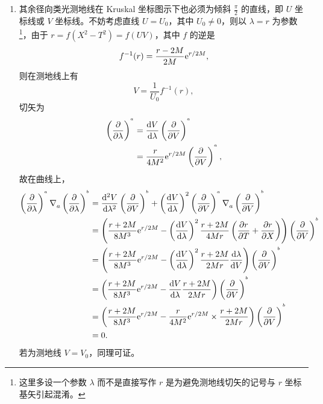 \begin{xiti}
\begin{zm}
\begin{enumerate}[label = (\arabic*)]
			\item 其余径向类光测地线在 Kruskal 坐标图示下也必须为倾斜 $\frac{\pi}{2}$ 的直线，即 $U$ 坐标线或 $V$ 坐标线。不妨考虑直线 $U = U_0$，其中 $U_0 \neq 0$，则以 $\lambda=r$ 为参数\footnote{这里多设一个参数 $\lambda$ 而不是直接写作 $r$ 是为避免测地线切矢的记号与 $r$ 坐标基矢引起混淆。}，由于 $r = f(X^2 - T^2) = f(UV)$，其中 $f$ 的逆是
			\begin{equation*}
				f^{-1}(r) = \frac{r-2M}{2M} \mathrm{e}^{r/2M},
			\end{equation*}
			则在测地线上有
			\begin{equation*}
				V = \frac{1}{U_0} f^{-1}(r),
			\end{equation*}
			切矢为
				\begin{align*}
					\tensorp{\lambda}{^a} &= \dv{V}{\lambda} \tensorp{V}{^a}\\
					&= \frac{r}{4M^2} \e{r/2M} \tensorp{V}{^a},
				\end{align*}
				故在曲线上，
				\begin{align*}
					\tensorp{\lambda}{^a} \Nabla{a} \tensorp{\lambda}{^b} &= \dv[2]{V}{\lambda} \tensorp{V}{^b} + \left( \dv{V}{\lambda} \right)^2 \tensorp{V}{^a} \Nabla{a} \tensorp{V}{^b}\\
					&= \left( \frac{r+2M}{8M^3} \e{r/2M} - \left( \dv{V}{\lambda} \right)^2 \frac{r+2M}{4Mr} \left( \pdv{r}{T} + \pdv{r}{X} \right) \right) \tensorp{V}{^b}\\
					&= \left( \frac{r+2M}{8M^3} \e{r/2M} - \left( \dv{V}{\lambda} \right)^2 \frac{r+2M}{2Mr} \dv{\lambda}{V} \right) \tensorp{V}{^b}\\
					&= \left( \frac{r+2M}{8M^3} \e{r/2M} - \dv{V}{\lambda} \frac{r+2M}{2Mr} \right) \tensorp{V}{^b}\\
					&= \left( \frac{r+2M}{8M^3} \e{r/2M} - \frac{r}{4M^2} \e{r/2M} \times \frac{r+2M}{2 Mr} \right) \tensorp{V}{^b}\\
					&= 0.
				\end{align*}
				若为测地线 $V = V_0$，同理可证。
		\end{enumerate}
	\end{zm}


\end{xiti}
